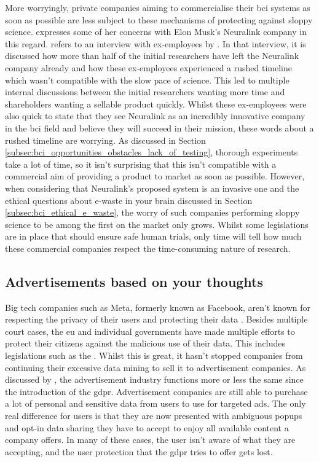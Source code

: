 More worryingly, private companies aiming to commercialise their \gls{bci} systems as soon as possible are less subject to these mechanisms of protecting against sloppy science.
 expresses some of her concerns with Elon Musk's Neuralink company in this regard.
 refers to an interview with ex-employees by \citet{neuralink_rushed_timelines}.
In that interview, it is discussed how more than half of the initial researchers have left the Neuralink company already and how these ex-employees experienced a rushed timeline which wasn't compatible with the slow pace of science.
This led to multiple internal discussions between the initial researchers wanting more time and shareholders wanting a sellable product quickly.
Whilst these ex-employees were also quick to state that they see Neuralink as an incredibly innovative company in the \gls{bci} field and believe they will succeed in their mission, these words about a rushed timeline are worrying.
As discussed in Section \ref{subsec:bci_opportunities_obstacles_lack_of_testing}, thorough experiments take a lot of time, so it isn't surprising that this isn't compatible with a commercial aim of providing a product to market as soon as possible.
However, when considering that Neuralink's proposed system is an invasive one and the ethical questions about e-waste in your brain discussed in Section \ref{subsec:bci_ethical_e_waste}, the worry of such companies performing sloppy science to be among the first on the market only grows.
Whilst some legislations are in place that should ensure safe human trials, only time will tell how much these commercial companies respect the time-consuming nature of research.



\subsection{Advertisements based on your thoughts}
\label{subsec:bci_ethical_data_mining}

Big tech companies such as Meta, formerly known as Facebook, aren't known for respecting the privacy of their users and protecting their data \citep{facebook_drama1, facebook_drama2}.
Besides multiple court cases, the \gls{eu} and individual governments have made multiple efforts to protect their citizens against the malicious use of their data.
This includes legislations such as the .
Whilst this is great, it hasn't stopped companies from continuing their excessive data mining to sell it to advertisement companies.
As discussed by \citet{gdpr_adds}, the advertisement industry functions more or less the same since the introduction of the \gls{gdpr}.
Advertisement companies are still able to purchase a lot of personal and sensitive data from users to use for targeted ads.
The only real difference for users is that they are now presented with ambiguous popups and opt-in data sharing they have to accept to enjoy all available content a company offers.
In many of these cases, the user isn't aware of what they are accepting, and the user protection that the \gls{gdpr} tries to offer gets lost.

